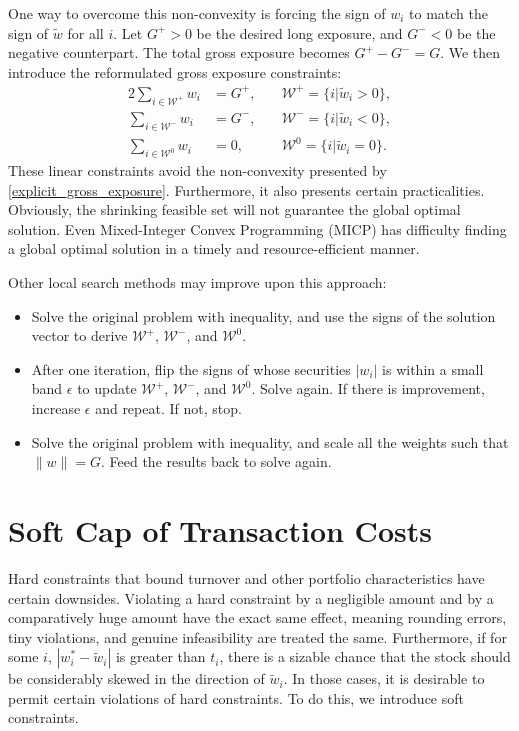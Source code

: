 \documentclass[11pt, letterpaper]{article}
\begin{document}
One way to overcome this non-convexity is forcing the sign of $w_i$ to match the sign of $\tilde{w}$ for all $i$. Let $G^+ > 0$
be the desired long exposure, and $G^- < 0$ be the negative counterpart. The total gross exposure becomes
$G^+ - G^- = G$. We then introduce the reformulated gross exposure constraints:
\begin{alignat*}{2}
	\sum_{i\in\mathcal{W}^+} {w_i} &= G^+,\quad & \mathcal{W}^+=\{i|\tilde{w}_i > 0\},\\
	\sum_{i\in\mathcal{W}^-} {w_i} &= G^-,\quad & \mathcal{W}^-=\{i|\tilde{w}_i < 0\},\\
	\sum_{i\in\mathcal{W}^0} {w_i} &= 0, & \mathcal{W}^0=\{i|\tilde{w}_i = 0\}.
\end{alignat*}
These linear constraints avoid the non-convexity presented by \eqref{explicit_gross_exposure}. Furthermore, it also presents
certain practicalities. Obviously, the shrinking feasible set will not guarantee the global optimal solution. Even Mixed-Integer
Convex Programming (MICP) has difficulty finding a global optimal solution in a timely and resource-efficient manner.

Other local search methods may improve upon this approach:
\begin{itemize}
	\item Solve the original problem with inequality, and use the signs of the solution vector to derive $\mathcal{W}^+$,
	$\mathcal{W}^-$, and $\mathcal{W}^0$.

    \item After one iteration, flip the signs of whose securities $|w_i|$ is within a small band $\epsilon$ to update
    $\mathcal{W}^+$, $\mathcal{W}^-$, and $\mathcal{W}^0$. Solve again. If there is improvement, increase $\epsilon$ and repeat.
    If not, stop.

    \item Solve the original problem with inequality, and scale all the weights such that $\lVert w\rVert = G$.
    Feed the results back to solve again.
\end{itemize}

\section{Soft Cap of Transaction Costs}

Hard constraints that bound turnover and other portfolio characteristics have certain downsides. Violating a hard constraint by
a negligible amount and by a comparatively huge amount have the exact same effect, meaning rounding errors, tiny violations,
and genuine infeasibility are treated the same. Furthermore, if for some $i$, $|w_i^* - \tilde{w}_i|$ is greater than $t_i$,
there is a sizable chance that the stock should be considerably skewed in the direction of $\tilde{w}_i$. In those cases,
it is desirable to permit certain violations of hard constraints. To do this, we introduce soft constraints.
\end{document}
